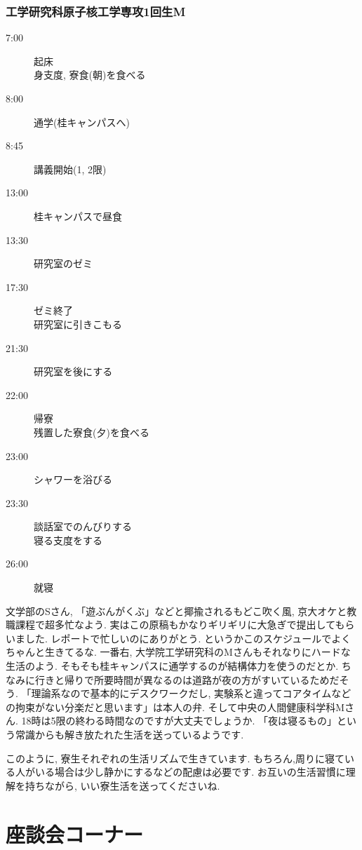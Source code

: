 \documentclass[10pt,b5jsbook,dvips,dvipdfmx,openany]{jsbook}
\theoremstyle{definition}
\begin{document}
			\subsubsection{工学研究科原子核工学専攻1回生M}

			\begin{description}
			\item[ 7:00] 起床 \\ 身支度, 寮食(朝)を食べる
			\item[ 8:00] 通学(桂キャンパスへ)
			\item[ 8:45] 講義開始(1, 2限)
			\item[13:00] 桂キャンパスで昼食
			\item[13:30] 研究室のゼミ
			\item[17:30] ゼミ終了 \\ 研究室に引きこもる
			\item[21:30] 研究室を後にする
			\item[22:00] 帰寮\\ 残置した寮食(夕)を食べる
			\item[23:00] シャワーを浴びる
			\item[23:30] 談話室でのんびりする \\ 寝る支度をする
			\item[26:00] 就寝
			\end{description}

			文学部のSさん, 「遊ぶんがくぶ」などと揶揄されるもどこ吹く風, 京大オケと教職課程で超多忙なよう. 実はこの原稿もかなりギリギリに大急ぎで提出してもらいました. レポートで忙しいのにありがとう. というかこのスケジュールでよくちゃんと生きてるな. 一番右, 大学院工学研究科のMさんもそれなりにハードな生活のよう. そもそも桂キャンパスに通学するのが結構体力を使うのだとか. ちなみに行きと帰りで所要時間が異なるのは道路が夜の方がすいているためだそう. 「理論系なので基本的にデスクワークだし, 実験系と違ってコアタイムなどの拘束がない分楽だと思います」は本人の弁. そして中央の人間健康科学科Mさん. 18時は5限の終わる時間なのですが大丈夫でしょうか. 「夜は寝るもの」という常識からも解き放たれた生活を送っているようです.

			このように, 寮生それぞれの生活リズムで生きています. もちろん,周りに寝ている人がいる場合は少し静かにするなどの配慮は必要です. お互いの生活習慣に理解を持ちながら, いい寮生活を送ってくださいね.

\newpage
	\section{座談会コーナー}
\end{document}
